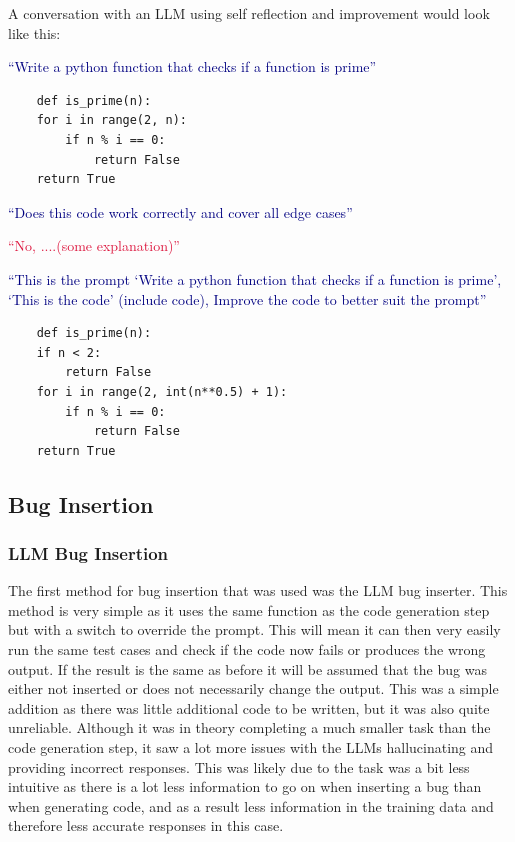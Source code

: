 \documentclass[12pt]{extarticle}
\begin{document}
A conversation with an LLM using self reflection and improvement would look like this:

\textcolor{navy}{``Write a python function that checks if a function is prime''}

\begin{lstlisting}
    def is_prime(n):
    for i in range(2, n):
        if n % i == 0:
            return False
    return True  
\end{lstlisting}

\textcolor{navy}{``Does this code work correctly and cover all edge cases''}

\textcolor{crimson}{``No, ....(some explanation)''}

\textcolor{navy}{``This is the prompt `Write a python function that checks if a function is prime', `This is the code' (include code), Improve the code to better suit the prompt''}

\begin{lstlisting}
    def is_prime(n):
    if n < 2:
        return False
    for i in range(2, int(n**0.5) + 1):
        if n % i == 0:
            return False
    return True
\end{lstlisting}

\subsection{Bug Insertion}
\subsubsection{LLM Bug Insertion}

The first method for bug insertion that was used was the LLM bug inserter. This method is very simple as it uses the same function as the code generation step but with a switch to override the prompt. This will mean it can then very easily run the same test cases and check if the code now fails or produces the wrong output. If the result is the same as before it will be assumed that the bug was either not inserted or does not necessarily change the output. This was a simple addition as there was little additional code to be written, but it was also quite unreliable. Although it was in theory completing a much smaller task than the code generation step, it saw a lot more issues with the LLMs hallucinating and providing incorrect responses. This was likely due to the task was a bit less intuitive as there is a lot less information to go on when inserting a bug than when generating code, and as a result less information in the training data and therefore less accurate responses in this case.
\end{document}
